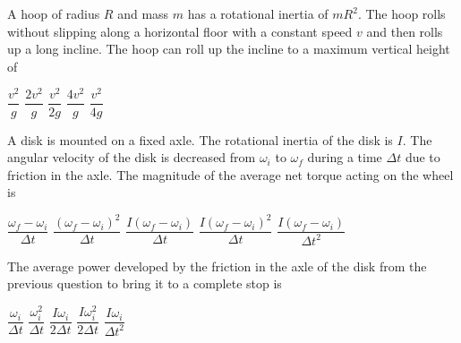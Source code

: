 \documentclass{../../../oss-apphys-exam}
\begin{document}


\raggedcolumns


\begin{questions}
    
  \question A hoop of radius $R$ and mass $m$ has a rotational inertia of
  $mR^2$. The hoop rolls without slipping along a horizontal floor with a
  constant speed $v$ and then rolls up a long incline. The hoop can roll up the
  incline to a maximum vertical height of
  \begin{center}
  \end{center}
  \begin{choices}
    \choice$\dfrac{v^2}g$
    \choice$\dfrac{2v^2}{g}$
    \choice$\dfrac{v^2}{2g}$
    \choice$\dfrac{4v^2}{g}$
    \choice$\dfrac{v^2}{4g}$
  \end{choices}
    
  \question A disk is mounted on a fixed axle. The rotational inertia of the
  disk is $I$. The angular velocity of the disk is decreased from $\omega_i$ to
  $\omega_f$ during a time $\Delta t$ due to friction in the axle. The
  magnitude of the average net torque acting on the wheel is
  \begin{choices}
    \choice $\dfrac{\omega_f-\omega_i}{\Delta t}$
    \choice $\dfrac{(\omega_f-\omega_i)^2}{\Delta t}$
    \choice $\dfrac{I(\omega_f-\omega_i)}{\Delta t}$
    \choice $\dfrac{I(\omega_f-\omega_i)^2}{\Delta t}$
    \choice $\dfrac{I(\omega_f-\omega_i)}{\Delta t^2}$
  \end{choices}
    
  \question The average power developed by the friction in the axle of the disk
  from the previous question to bring it to a complete stop is
  \begin{choices}
    \choice $\dfrac{\omega_i}{\Delta t}$
    \choice $\dfrac{\omega_i^2}{\Delta t}$
    \choice $\dfrac{I\omega_i}{2\Delta t}$
    \choice $\dfrac{I\omega_i^2}{2\Delta t}$
    \choice $\dfrac{I\omega_i}{\Delta t^2}$
  \end{choices}
  \newpage
  

\end{questions}
\end{document}
